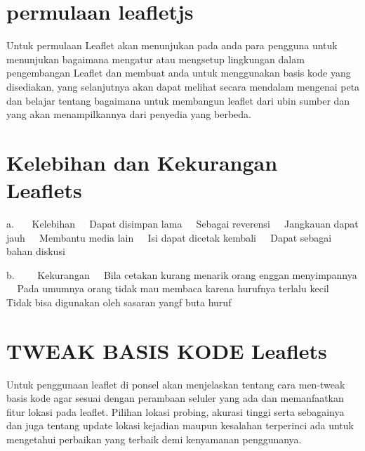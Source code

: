 \section{permulaan leafletjs}
Untuk permulaan Leaflet akan menunjukan pada anda para pengguna untuk menunjukan bagaimana mengatur atau mengsetup lingkungan dalam pengembangan Leaflet dan membuat anda untuk menggunakan basis kode yang disediakan, yang selanjutnya akan dapat melihat secara mendalam mengenai peta dan belajar tentang bagaimana untuk membangun leaflet dari ubin sumber dan yang akan menampilkannya dari penyedia yang berbeda.


\section{Kelebihan dan Kekurangan Leaflets}
a.    Kelebihan
  Dapat disimpan lama
  Sebagai reverensi
  Jangkauan dapat jauh
  Membantu media lain
  Isi dapat dicetak kembali
  Dapat sebagai bahan diskusi

b.     Kekurangan
  Bila cetakan kurang menarik orang enggan menyimpannya
  Pada umumnya orang tidak mau membaca karena hurufnya terlalu kecil
  Tidak bisa digunakan oleh sasaran yangf buta huruf

\section{TWEAK BASIS KODE Leaflets}
Untuk penggunaan leaflet di ponsel akan menjelaskan tentang cara men-tweak basis kode agar sesuai dengan perambaan seluler yang ada  dan memanfaatkan fitur lokasi pada leaflet. Pilihan lokasi probing, akurasi tinggi serta sebagainya dan juga tentang update lokasi kejadian maupun kesalahan terperinci ada untuk mengetahui perbaikan yang terbaik demi kenyamanan penggunanya.
